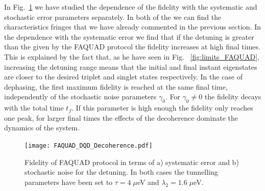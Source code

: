 \documentclass[a4paper,11pt]{article}
\begin{document}
In Fig.~\ref{fig:FAQUAD_DQD_errors} we have studied the dependence of the fidelity with the systematic and stochastic error parameters separately. In both of the we can find the characteristics fringes that we have already commented in the previous section. In the dependence with the systematic error we find that if the detuning is greater than the given by the FAQUAD protocol the fidelity increases at high final times. This is explained by the fact that, as he have seen in Fig.~ \ref{fig:limits_FAQUAD}, increasing the detuning range means that the initial and final instant eigenstates are closer to the desired triplet and singlet states respectively. In the case of dephasing, the first maximum fidelity is reached at the same final time, independently of the stochastic noise parameters $\gamma_0$. For $\gamma_0\neq 0$ the fidelity decays with the total time $t_f$. If this parameter is high enough the fidelity only reaches one peak, for larger final times the effects of the decoherence  dominate the dynamics of the system.
\begin{figure}[!htbp]
	\centering
	\texttt{[image: FAQUAD\_DQD\_Decoherence.pdf]}
	\caption{Fidelity of FAQUAD protocol in terms of a) systematic error and b) stochastic noise for the detuning. In both cases the tunnelling parameters have been set to $\tau=4\; \mu$eV and $\lambda_{2}=1.6\; \mu$eV.}
	\label{fig:FAQUAD_DQD_errors}
\end{figure}
\newpage
\appendix
\end{document}

